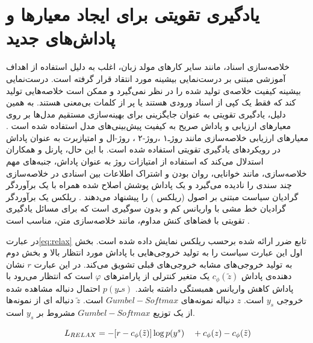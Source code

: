\section{یادگیری تقویتی  برای ایجاد معیارها و پاداش‌های جدید}
	
	خلاصه‌سازی اسناد، مانند سایر کارهای مولد زبان،  اغلب به دلیل استفاده از اهداف آموزشی مبتنی بر  درست‌نمایی بیشینه
	 مورد انتقاد قرار گرفته است.
	درست‌نمایی بیشینه کیفیت خلاصه‌ی تولید شده را در نظر نمی‌گیرد و ممکن است خلاصه‌هایی تولید کند که فقط یک کپی از اسناد ورودی هستند یا پر از کلمات بی‌معنی هستند. به همین دلیل، یادگیری تقویتی به عنوان جایگزینی برای بهینه‌سازی مستقیم مدل‌ها بر روی معیارهای ارزیابی و پاداش صریح به کیفیت پیش‌بینی‌های مدل استفاده شده است
	\cite{Parnell2022AMC}. 
	معیارهای ارزیابی خلاصه‌سازی مانند روژـ۱
،روژ-۲
،
روژ-‌ال
	و امتیازبرت
	 به عنوان پاداش در رویکردهای یادگیری تقویتی استفاده شده است. با این حال، پارنل و همکاران  استدلال می‌کند که استفاده از امتیازات روژ به عنوان پاداش، جنبه‌های مهم خلاصه‌سازی، مانند خوانایی، روان بودن و اشتراک اطلاعات بین اسنادی در خلاصه‌سازی چند سندی را نادیده می‌گیرد و یک پاداش پوشش اصلاح شده همراه با یک برآوردگر گرادیان سیاست مبتنی بر اصول (ریلکس )
	  را پیشنهاد می‌دهند
	  \cite{Parnell2022AMC, ALOMARI}.
	   ریلکس یک برآوردگر گرادیان خط مشی
	  با واریانس کم و بدون سوگیری
	     است که برای مسائل یادگیری تقویتی با فضاهای کنش مداوم، مانند خلاصه‌سازی متن، مناسب است
	     \cite{Grathwohl2017BackpropagationTT}.
	     
	   در عبارت\ref {eq:relax} تابع ضرر ارائه شده برحسب ریلکس نمایش داده شده است.
	  بخش اول این عبارت سیاست را به تولید خروجی‌هایی با پاداش مورد انتظار بالا و بخش دوم به تولید خروجی‌‌های مشابه خروجی‌های قبلی 
	  تشویق می‌کند.
  در این عبارت
	  $ r $
	  نشان دهنده‌ی پاداش 
	 $  c_\phi(\tilde{z}) $
	 یک متغیر کنترلی از پارامترهای $ φ $ است که انتظار می‌رود با پاداش کاهش واریانس همبستگی داشته باشد.
	$  p(yـs) $ 
	احتمال دنباله مشاهده شده خروجی $ y_s $ است.
	 $ z $
	  دنباله نمونه‌های $Gumbel-Softmax  $ است.
	 $ \tilde{z} $
	  دنباله ای از نمونه‌ها از یک توزیع $ Gumbel-Softmax $ مشروط بر $ y_s $ است.
	

	  \begin{equation}
	  \label{eq:relax}
	  L_\text{$ RELAX $} = -[r - c_\phi(\tilde{z})]   \log p(y^{s}) \quad + c_\phi(z) - c_\phi(\tilde{z})
	  \end{equation}
	
